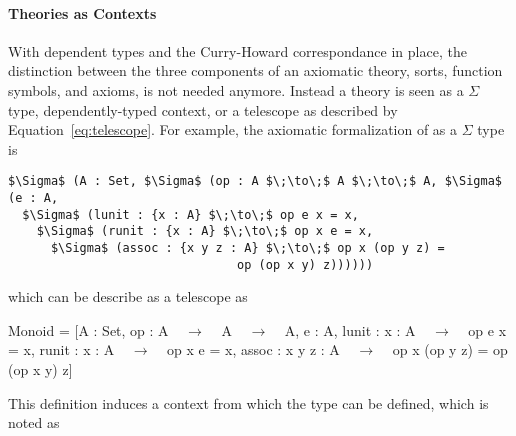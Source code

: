 \paragraph{Theories as Contexts}
With dependent types and the Curry-Howard correspondance in place, the distinction between the three components of an axiomatic theory, sorts, function symbols, and axioms, is not needed anymore. Instead a theory is seen as a $\Sigma$ type, dependently-typed context, or a telescope as described by Equation~\ref{eq:telescope}. 
For example, the axiomatic formalization of  as a $\Sigma$ type is 
\begin{lstlisting}[mathescape]
$\Sigma$ (A : Set, $\Sigma$ (op : A $\;\to\;$ A $\;\to\;$ A, $\Sigma$ (e : A, 
  $\Sigma$ (lunit : {x : A} $\;\to\;$ op e x = x,
    $\Sigma$ (runit : {x : A} $\;\to\;$ op x e = x,
      $\Sigma$ (assoc : {x y z : A} $\;\to\;$ op x (op y z) = 
                                op (op x y) z))))))
\end{lstlisting} 
which can be describe as a telescope as  
\begin{togcode} 
Monoid = [A : Set, op : A ~$\;\to\;$~ A ~$\;\to\;$~ A, e : A, 
          lunit : {x : A} ~$\;\to\;$~ op e x = x, 
          runit : {x : A} ~$\;\to\;$~ op x e = x, 
          assoc : {x y z : A} ~$\;\to\;$~ op x (op y z) = op (op x y) z] 
\end{togcode} 
This definition induces a context from which the type  can be defined, which is noted as   



